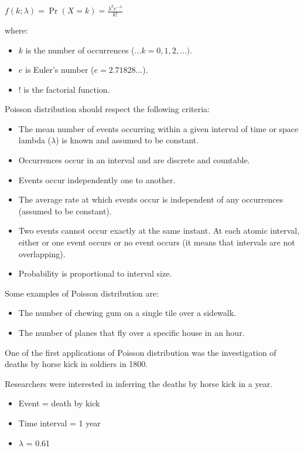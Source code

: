 \documentclass{article}
\begin{document}
$ \displaystyle f(k;\lambda )=\Pr(X{=}k)={\frac {\lambda ^{k}e^{-\lambda }}{k!}} $

where:
\begin{itemize}
    \item $k$ is the number of occurrences ($…k=0,1,2,\ldots) $.
    \item $e$ is Euler's number ($ e=2.71828\ldots$).
    \item $!$ is the factorial function.
\end{itemize}

Poisson distribution should respect the following criteria:
\begin{itemize}
    \item The mean number of events occurring within a given interval of time or space lambda ($\lambda$) is known and assumed to be constant.
    \item Occurrences occur in an interval and are discrete and countable.
    \item Events occur independently one to another.
    \item The average rate at which events occur is independent of any occurrences (assumed to be constant).
    \item Two events cannot occur exactly at the same instant. At each atomic interval, either or one event occurs or no event occurs (it means that intervals are not overlapping).
    \item Probability is proportional to interval size. 
\end{itemize}

Some examples of Poisson distribution are:
\begin{itemize}
    \item The number of chewing gum on a single tile over a sidewalk. 
    \item The number of planes that fly over a specific house in an hour.
\end{itemize}

One of the first applications of Poisson distribution was the investigation of deaths by horse kick in soldiers in 1800. 

Researchers were interested in inferring the deaths by horse kick in a year.
\begin{itemize}
    \item Event = death by kick
    \item Time interval = 1 year
    \item $\lambda$ = 0.61
\end{itemize}
\end{document}
